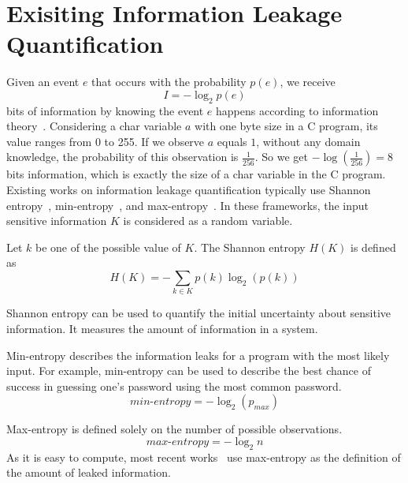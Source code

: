 
\newcommand{\vvv}{\vspace*{-3pt}}

\section{Exisiting Information Leakage Quantification}

Given an event $e$ that occurs with the probability $p(e)$, we receive
\begin{displaymath}
    I = - \log_2p(e)
\end{displaymath}
bits of information by knowing the event $e$ happens according to information theory~\cite{shannon1948mathematical}. 
Considering a char variable $a$
with one byte size in a C program, its value ranges from 0 to 255.
If we observe $a$ equals $1$, without any domain knowledge, 
the probability of this observation is $\frac{1}{256}$. 
So we get $-\log(\frac{1}{256}) = 8$ bits information, which is exactly the size
of a char variable in the C program.
Existing works on information leakage quantification typically use Shannon
entropy~\cite{clark2007static,Wichelmann:2018:MFF:3274694.3274741},
min-entropy~\cite{10.1007/978-3-642-00596-1_21}, and max-entropy~\cite{182946,
Doychev:2017:RAS:3062341.3062388}. In these frameworks, the input sensitive
information $K$ is considered as a random variable.

Let $k$ be one of the possible
value of $K$. The Shannon entropy $H(K)$ is defined as
\begin{displaymath}
    H(K) = - \sum_{k {\in} K}p(k)\log_2(p(k))
\end{displaymath}

Shannon entropy can be used to quantify the initial uncertainty about
sensitive information. It measures the amount of information in a system.

Min-entropy describes the information leaks for a program with the most likely input. 
For example, min-entropy can be used to describe the
best chance of success in guessing one's password using the
most common password. %
\begin{displaymath}
    \mathit{min\text{-}entropy} = - \log_2(p_{\mathit{max}})
\end{displaymath}

Max-entropy is defined solely on the number of possible observations.
\begin{displaymath}
    \mathit{max\text{-}entropy} = -\log_2{n}
\end{displaymath}
As it is easy to compute, most recent works~\cite{182946,Doychev:2017:RAS:3062341.3062388} use max-entropy as the definition of
the amount of leaked information.

